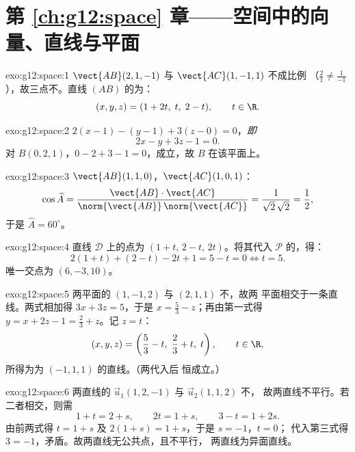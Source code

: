 \section*{第 \ref{ch:g12:space} 章——空间中的向量、直线与平面}

\begin{solution}{exo:g12:space:1}
$\vect{AB}(2, 1, -1)$ 与 $\vect{AC}(1, -1, 1)$ 不成比例
（$\frac21 \neq \frac{1}{-1}$），故三点不。直线 $(AB)$ 的为：
\[
(x, y, z) = (1 + 2t,\; t,\; 2 - t), \qquad t \in \R .
\]
\end{solution}

\begin{solution}{exo:g12:space:2}
$2(x - 1) - (y - 1) + 3(z - 0) = 0$，\emph{即}
\[
2x - y + 3z - 1 = 0 .
\]
对 $B(0,2,1)$，$0 - 2 + 3 - 1 = 0$，成立，故 $B$ 在该平面上。
\end{solution}

\begin{solution}{exo:g12:space:3}
$\vect{AB}(1,1,0)$，$\vect{AC}(1,0,1)$：
\[
\cos\widehat{A}
= \frac{\vect{AB}\cdot\vect{AC}}{\norm{\vect{AB}}\,\norm{\vect{AC}}}
= \frac{1}{\sqrt2\,\sqrt2} = \frac12,
\]
于是 $\widehat A = 60^\circ$。
\end{solution}

\begin{solution}{exo:g12:space:4}
直线 $\mathcal D$ 上的点为 $(1 + t,\, 2 - t,\, 2t)$。将其代入
$\mathcal P$ 的，得：
\[
2(1+t) + (2 - t) - 2t + 1 = 5 - t = 0 \iff t = 5 .
\]
唯一交点为 $(6, -3, 10)$。
\end{solution}

\begin{solution}{exo:g12:space:5}
两平面的 $(1, -1, 2)$ 与 $(2, 1, 1)$ 不，故两
平面相交于一条直线。两式相加得 $3x + 3z = 5$，于是
$x = \frac53 - z$；再由第一式得
$y = x + 2z - 1 = \frac23 + z$。记 $z = t$：
\[
(x, y, z) = \left(\frac53 - t,\; \frac23 + t,\; t\right), \qquad t \in \R,
\]
所得为为 $(-1, 1, 1)$ 的直线。（两代入后
恒成立。）
\end{solution}

\begin{solution}{exo:g12:space:6}
两直线的 $\vec u_1(1, 2, -1)$ 与 $\vec u_2(1, 1, 2)$ 不，
故两直线不平行。若二者相交，则需
\[
1 + t = 2 + s, \qquad 2t = 1 + s, \qquad 3 - t = 1 + 2s .
\]
由前两式得 $t = 1 + s$ 及 $2(1+s) = 1 + s$，于是 $s = -1$，$t = 0$；
代入第三式得 $3 = -1$，矛盾。故两直线无公共点，且不平行，
两直线为异面直线。
\end{solution}

